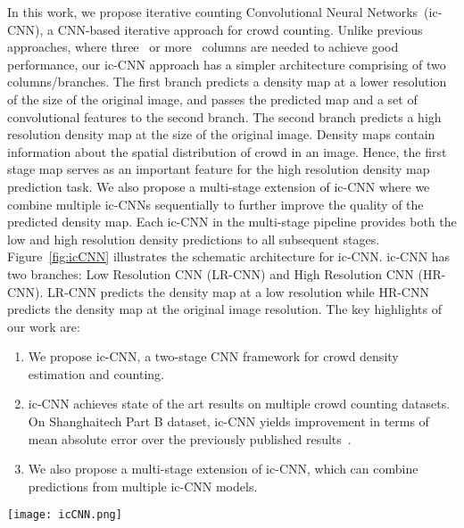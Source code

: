 \documentclass[runningheads]{llncs}
\begin{document}
In this work, we propose iterative counting Convolutional Neural Networks~(ic-CNN), a CNN-based iterative approach for crowd counting. Unlike previous approaches, where  three~\cite{zhang2016single,sam2017switching} or more~\cite{sindagi2017generating} columns are needed to achieve good performance, our ic-CNN approach has a simpler architecture comprising of two columns/branches. The first branch predicts a  density map at a lower resolution of  the size of the original image, and passes the predicted map and a set of convolutional features to the second branch. The second branch predicts a high resolution density map at the size of the original image. Density maps contain information about the spatial distribution of crowd in an image. Hence, the first stage map serves as an important feature for the high resolution density map prediction task. We also propose a multi-stage extension of ic-CNN where we combine multiple ic-CNNs sequentially to further improve the quality of the predicted density map. Each ic-CNN in the multi-stage pipeline provides both the low and high resolution density predictions to all subsequent stages. Figure~\ref{fig:icCNN} illustrates the schematic architecture for ic-CNN. ic-CNN has two branches: Low Resolution CNN (LR-CNN) and High Resolution CNN (HR-CNN). LR-CNN predicts the density map at a low resolution while HR-CNN predicts the density map at the original image resolution. The key highlights of our work are:
 \begin{enumerate}
 \item We propose ic-CNN, a two-stage CNN framework for crowd density estimation and counting.
 
 \item ic-CNN achieves state of the art results on multiple crowd counting datasets. On Shanghaitech Part B dataset, ic-CNN yields  improvement in terms of mean absolute error over the previously published results~\cite{sindagi2017generating}. 
 \item We also propose a multi-stage extension of ic-CNN, which can combine
 predictions from multiple ic-CNN models. 
 \end{enumerate}


\begin{figure*}[t]
\centering
\texttt{[image: icCNN.png]}
	\caption{
     Figure shows the ic-CNN architecture which consists of two columns/branches. On the top is the Low Resolution CNN branch (LR-CNN) and at the bottom is the High Resolution CNN branch (HR-CNN). LR-CNN predicts a density map at a lower resolution (LR). It passes the predicted density map and the convolutional feature maps to HR-CNN. HR-CNN fuses its feature maps with the feature maps and predicted density map from LR-CNN, and predicts a high resolution density map (HR) at the size of the original image. LR and HR are low and high resolution prediction maps respectively.
     \label{fig:icCNN}}	
\end{figure*}
\end{document}
